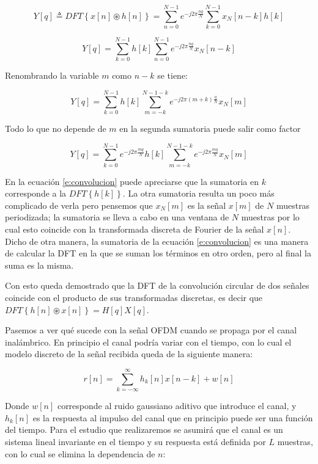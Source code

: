 \begin{equation}
Y[q] \triangleq DFT\left\{x[n] \circledast h[n]\right\} = \sum_{n=0}^{N-1}e^{-j2\pi \frac{ nq}{N}} \sum_{k = 0}^{N-1}x_N[n-k]h[k] 
\end{equation}

\begin{equation}
Y[q] = \sum_{k = 0}^{N-1}h[k] \sum_{n=0}^{N-1} e^{-j2\pi \frac{nq}{N}} x_N[n-k]
\end{equation}

Renombrando la variable $m$ como $n - k$ se tiene:

\begin{equation}
Y[q] = \sum_{k = 0}^{N-1}h[k] \sum_{m = -k}^{N-1-k} e^{-j2\pi (m+k)\frac{q}{N}} x_N[m]
\end{equation}

Todo lo que no depende de $m$ en la segunda sumatoria puede salir como factor

\begin{equation}\label{e:convolucion}
Y[q] = \sum_{k = 0}^{N-1}e^{-j2\pi \frac{mq}{N}}h[k] \sum_{m = -k}^{N-1-k} e^{-j2\pi \frac{mq}{N}} x_N[m]
\end{equation}

En la ecuación \ref{e:convolucion} puede apreciarse que la sumatoria en $k$ corresponde a la $DFT\left\{ h[k] \right \}$.
La otra sumatoria resulta un poco más complicado de verla pero pensemos que $x_N[m]$ es la señal $x[m]$ de $N$ muestras periodizada; la sumatoria se lleva a cabo en una ventana de $N$ muestras por lo cual esto coincide con la transformada discreta de Fourier de la señal $x[n]$. Dicho de otra manera, la sumatoria de la ecuación \ref{e:convolucion} es una manera de calcular la DFT en la que se suman los términos en otro orden, pero al final la suma es la misma.

Con esto queda demostrado que la DFT de la convolución circular de dos señales coincide con el producto de sus transformadas discretas, es decir que $DFT\left\{ h[n] \circledast x[n] \right \} = H[q]X[q]$.

Pasemos a ver qué sucede con la señal OFDM cuando se propaga por el canal inalámbrico. En principio el canal podría variar con el tiempo, con lo cual el modelo discreto de la señal recibida queda de la siguiente manera:

\begin{equation}
r[n] = \sum_{k = -\infty}^{\infty} h_k[n]x[n-k] + w[n]
\end{equation}

Donde $w[n]$ corresponde al ruido gaussiano aditivo que introduce el canal, y $h_k[n]$ es la respuesta al impulso del canal que en principio puede ser una función del tiempo. Para el estudio que realizaremos se asumirá que el canal es un sistema lineal invariante en el tiempo y su respuesta está definida por $L$ muestras, con lo cual se elimina la dependencia de $n$:

